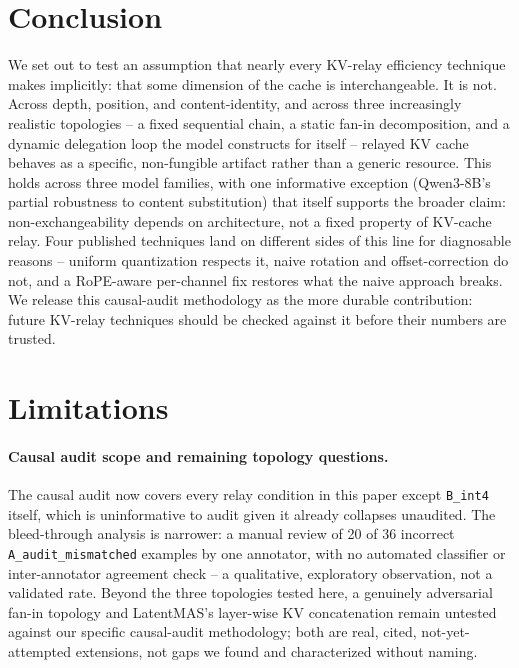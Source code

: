 \documentclass[11pt]{article}
\begin{document}
\section{Conclusion}
We set out to test an assumption that nearly every KV-relay efficiency
technique makes implicitly: that some dimension of the cache is
interchangeable. It is not. Across depth, position, and content-identity,
and across three increasingly realistic topologies -- a fixed sequential
chain, a static fan-in decomposition, and a dynamic delegation loop the
model constructs for itself -- relayed KV cache behaves as a specific,
non-fungible artifact rather than a generic resource. This holds across
three model families, with one informative exception (Qwen3-8B's partial
robustness to content substitution) that itself supports the broader
claim: non-exchangeability depends on architecture, not a fixed property
of KV-cache relay. Four published techniques land on different sides of
this line for diagnosable reasons -- uniform quantization respects it,
naive rotation and offset-correction do not, and a RoPE-aware per-channel
fix restores what the naive approach breaks. We release this causal-audit
methodology as the more durable contribution: future KV-relay techniques
should be checked against it before their numbers are trusted.

\section*{Limitations}
\label{sec:limitations}

\paragraph{Causal audit scope and remaining topology questions.} The
causal audit now covers every relay condition in this paper except
\texttt{B\_int4} itself, which is uninformative to audit given it already
collapses unaudited. The bleed-through analysis is narrower: a manual
review of 20 of 36 incorrect \texttt{A\_audit\_mismatched} examples by one
annotator, with no automated classifier or inter-annotator agreement
check -- a qualitative, exploratory observation, not a validated rate.
Beyond the three topologies tested here, a genuinely adversarial fan-in
topology \citep{latentagentslie2026} and LatentMAS's layer-wise KV
concatenation \citep{latentmas2026} remain untested against our specific
causal-audit methodology; both are real, cited, not-yet-attempted
extensions, not gaps we found and characterized without naming.
\end{document}

